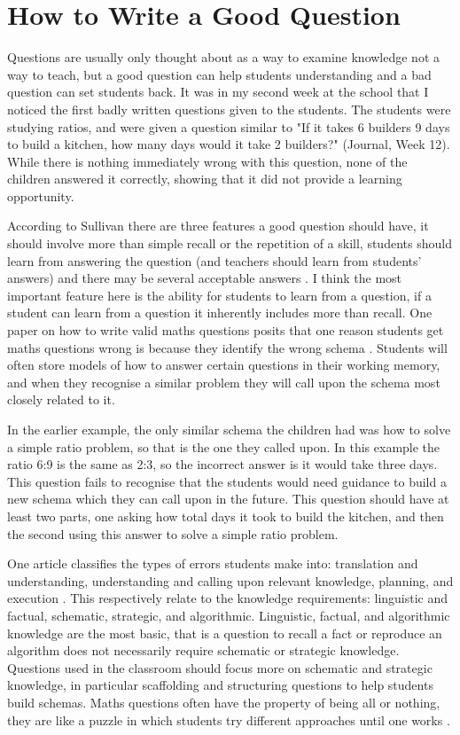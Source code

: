 \documentclass[11pt, a4paper, notitlepage]{article}
\begin{document}
\section*{How to Write a Good Question}
Questions are usually only thought about as a way to examine knowledge not a way to teach, but a good question can help students understanding and a bad question can set students back. It was in my second week at the school that I noticed the first badly written questions given to the students. The students were studying ratios, and were given a question similar to "If it takes 6 builders 9 days to build a kitchen, how many days would it take 2 builders?" (Journal, Week 12). While there is nothing immediately wrong with this question, none of the children answered it correctly, showing that it did not provide a learning opportunity.
\par
According to Sullivan there are three features a good question should have, it should involve more than simple recall or the repetition of a skill, students should learn from answering the question (and teachers should learn from students' answers) and there may be several acceptable answers \cite{Sullivan:1997}. I think the most important feature here is the ability for students to learn from a question, if a student can learn from a question it inherently includes more than recall. One paper on how to write valid maths questions posits that one reason students get maths questions wrong is because they identify the wrong schema \cite{Pollitt:2002}. Students will often store models of how to answer certain questions in their working memory, and when they recognise a similar problem they will call upon the schema most closely related to it. 
\par
In the earlier example, the only similar schema the children had was how to solve a simple ratio problem, so that is the one they called upon. In this example the ratio 6:9 is the same as 2:3, so the incorrect answer is it would take three days. This question fails to recognise that the students would need guidance to build a new schema which they can call upon in the future. This question should have at least two parts, one asking how total days it took to build the kitchen, and then the second using this answer to solve a simple ratio problem.
\par
One article classifies the types of errors students make into: translation and understanding, understanding and calling upon relevant knowledge, planning, and execution \cite{Fisher:1996}. This respectively relate to the knowledge requirements: linguistic and factual, schematic, strategic, and algorithmic. Linguistic, factual, and algorithmic knowledge are the most basic, that is a question to recall a fact or reproduce an algorithm does not necessarily require schematic or strategic knowledge. Questions used in the classroom should focus more on schematic and strategic knowledge, in particular scaffolding and structuring questions to help students build schemas. Maths questions often have the property of being all or nothing, they are like a puzzle in which students try different approaches until one works \cite{Pollitt:2002}. 
\end{document}
